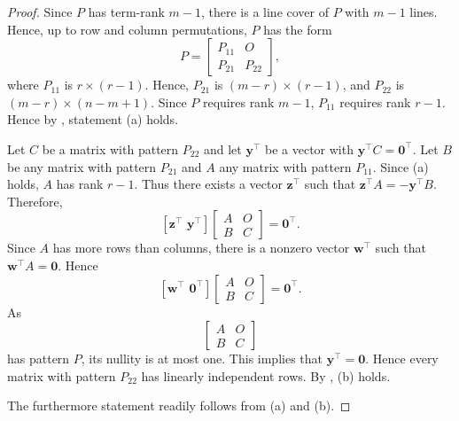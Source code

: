 \documentclass[preprint,12pt]{elsarticle}
\newcommand{\trans  }{^\top}
\begin{document}
\begin{proof}
Since $P$ has term-rank $m-1$, there is a line cover of $P$ with $m-1$ lines. Hence, up to row and column permutations, 
 $P$ has the form 
 \[
    P = \left\lbrack 
    \begin{array}{c|c}
         P_{11} & O  \\
         \hline
         P_{21} & P_{22} 
    \end{array}
    \right\rbrack,
    \]
    where $P_{11}$ is $r \times (r-1)$. Hence,  $P_{21}$ is $(m-r) \times (r-1)$, and $P_{22}$ is  $(m-r) \times (n-m+1)$. Since $P$ requires rank $m-1$, $P_{11}$ requires rank $r-1$.
    Hence by , statement (a) holds. 

    Let  $C$ be a matrix with pattern $P_{22}$ and  let $\mathbf y\trans$ be a vector 
    with $\mathbf y{\trans} C=\mathbf{0} \trans$. Let $B$ be any  matrix with pattern $P_{21}$ and $A$ 
    any matrix 
    with pattern $P_{11}$. Since (a) holds, $A$ has rank $r-1$. Thus there exists a vector $\mathbf z \trans$ such that $\mathbf z \trans A=-\mathbf y\trans B$.  Therefore, 
    \[ 
    [ \mathbf{z}\trans  \, \,  \mathbf{y}\trans] 
    \begin{bmatrix}
        A & O \\
        B & C 
    \end{bmatrix}
    = \mathbf 0\trans.
    \]
    Since $A$ has more rows than columns, there is a nonzero vector 
    $\mathbf{w}\trans$ such that $\mathbf {w} \trans A=\mathbf 0$.
    Hence 
    \[
     [ \mathbf{w}\trans  \, \,  \mathbf{0}\trans] 
    \begin{bmatrix}
        A & O \\
        B & C 
    \end{bmatrix}
    = \mathbf 0\trans.
    \]
    As 
    \[ \begin{bmatrix} 
        A & O \\ 
        B & C 
        \end{bmatrix}
    \]
    has pattern $P$, its nullity is at most one. This implies that 
    $\mathbf y\trans= \mathbf 0$. Hence every matrix with pattern $P_{22}$ has linearly independent rows.   By ,
    (b) holds. 

    The furthermore statement readily follows from (a) and (b). 
\end{proof}
\end{document}
